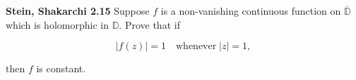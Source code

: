 \textbf{Stein, Shakarchi 2.15}
Suppose $f$ is a non-vanishing continuous function on $\overline{\mathbb{D}}$ which is holomorphic in $\mathbb{D}$. Prove
that if

$$
\left| f(z) \right| = 1 \quad \text{whenever} \; |z| = 1,
$$

then $f$ is constant.